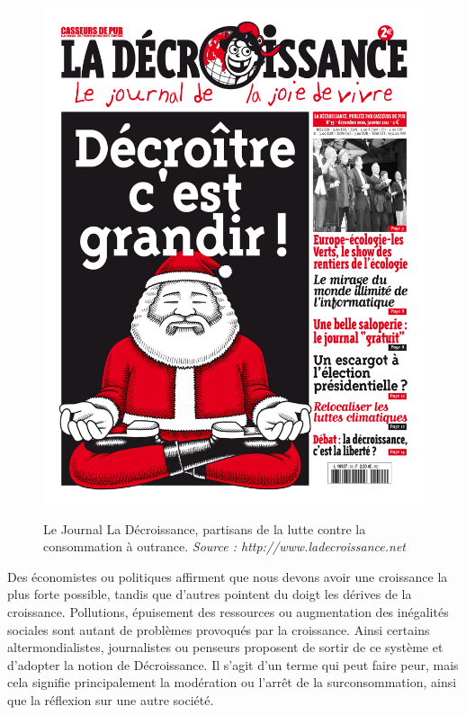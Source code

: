 \begin{figure}
~\includegraphics[scale=0.1]{Rsc/journal_La-Decroissance.jpg} 
\caption{Le Journal La Décroissance, partisans de la lutte contre la consommation à outrance. \textit{Source : http://www.ladecroissance.net}}
\label{journalDecroissance}
\end{figure} 


\bigbreak
Des économistes ou politiques affirment que nous devons avoir une croissance la plus forte possible, tandis que d'autres pointent du doigt les dérives de la croissance. Pollutions, épuisement des ressources ou augmentation des inégalités sociales sont autant de problèmes provoqués par la croissance. Ainsi certains altermondialistes, journalistes ou penseurs proposent de sortir de ce système et d'adopter la notion de Décroissance. Il s'agit d'un terme qui peut faire peur, mais cela signifie principalement la modération ou l'arrêt de la surconsommation, ainsi que la réflexion sur une autre société.






